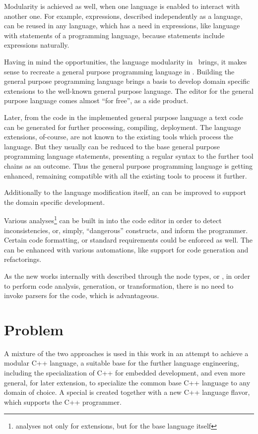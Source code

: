 Modularity is achieved as well, when one language is enabled to interact with another one. For example, expressions,
described independently as a language, can be reused in any language, which has a need in expressions, like language with
statements of a programming language, because statements include expressions naturally.

Having in mind the opportunities, the language modularity in \jbmps\ brings, it makes sense to recreate a general 
purpose programming language in \jbmps. Building the general purpose programming language brings a basis to develop 
domain specific extensions to the well-known general purpose language. The editor for the general purpose language comes 
almost ``for free'', as a side product. 

Later, from the code in the implemented general purpose language a text code can be generated for further processing, 
compiling, deployment. The language extensions, of-course, are not known to the existing tools which process the language.
But they usually can be reduced to the base general purpose programming language statements, presenting a regular 
syntax to the further tool chains as an outcome. Thus the general purpose programming language is getting enhanced,
remaining compatible with all the existing tools to process it further.

Additionally to the language modification itself, an  can be improved to support the domain specific 
development. 

Various analyses\footnote{analyses not only for extensions, but for the base language itself} 
can be built in into the code editor in order to detect inconsistencies, or, simply, ``dangerous'' constructs, 
and inform the programmer. Certain code formatting, or standard requirements could be enforced as well. 
The  can be enhanced with various automations, like support for code generation and refactorings. 

As the new  works internally with  described through the node types, or , in order to perform code
analysis, generation, or transformation, there is no need to invoke parsers for the code, which is advantageous.

\section{Problem}
A mixture of the two approaches is used in this work in an attempt to achieve a modular C++ language, a suitable base for the 
further language engineering, including the specialization  of C++ for embedded development, and even more general, 
for later extension, to specialize the common base C++ language to any domain of choice. A special  is created 
together with a new C++ language flavor, which supports the C++ programmer.

